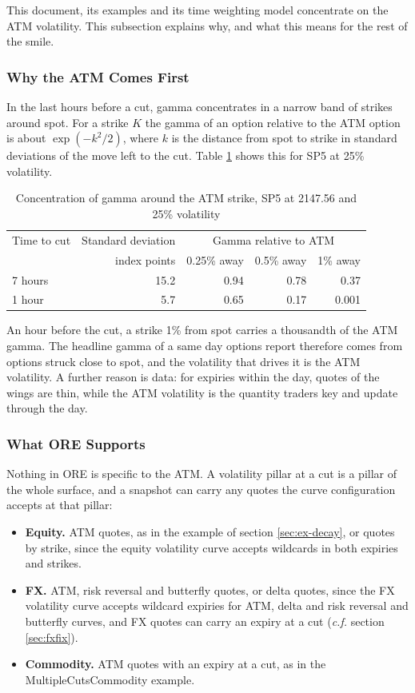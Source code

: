 \documentclass[12pt, a4paper]{article}
\begin{document}
This document, its examples and its time weighting model concentrate on the ATM volatility. This subsection explains why, and
what this means for the rest of the smile.

\subsubsection*{Why the ATM Comes First}

In the last hours before a cut, gamma concentrates in a narrow band of strikes around spot. For a strike $K$ the gamma
of an option relative to the ATM option is about $\exp(-k^2/2)$, where $k$ is the distance from spot to strike in
standard deviations of the move left to the cut. Table \ref{tab:gammaconc} shows this for SP5 at 25\% volatility.

\begin{table}[H]
\centering
\begin{tabular}{|l|r|r|r|r|}
\hline
Time to cut & Standard deviation & \multicolumn{3}{c|}{Gamma relative to ATM} \\
 & index points & 0.25\% away & 0.5\% away & 1\% away \\
\hline
7 hours & 15.2 & 0.94 & 0.78 & 0.37 \\
1 hour & 5.7 & 0.65 & 0.17 & 0.001 \\
\hline
\end{tabular}
\caption{Concentration of gamma around the ATM strike, SP5 at 2147.56 and 25\% volatility}
\label{tab:gammaconc}
\end{table}

An hour before the cut, a strike 1\% from spot carries a thousandth of the ATM gamma. The headline gamma of a same day
options report therefore comes from options struck close to spot, and the volatility that drives it is the ATM
volatility. A further reason is data: for expiries within the day, quotes of the wings are thin, while the ATM
volatility is the quantity traders key and update through the day.

\subsubsection*{What ORE Supports}

Nothing in ORE is specific to the ATM. A volatility pillar at a cut is a pillar of the whole surface, and a snapshot can
carry any quotes the curve configuration accepts at that pillar:

\begin{itemize}
\item \textbf{Equity.} ATM quotes, as in the example of section \ref{sec:ex-decay}, or quotes by strike, since the
  equity volatility curve accepts wildcards in both expiries and strikes.
\item \textbf{FX.} ATM, risk reversal and butterfly quotes, or delta quotes, since the FX volatility curve accepts
  wildcard expiries for ATM, delta and risk reversal and butterfly curves, and FX quotes can carry an expiry at a cut
  (\textit{c.f.} section \ref{sec:fxfix}).
\item \textbf{Commodity.} ATM quotes with an expiry at a cut, as in the MultipleCutsCommodity example.
\end{itemize}
\end{document}
